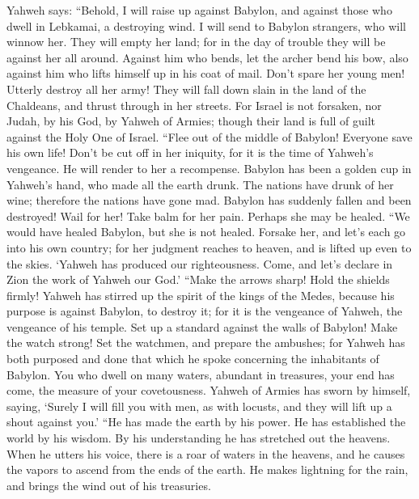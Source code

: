  Yahweh says: ``Behold, I will raise up against Babylon,
and against those who dwell in Lebkamai, a destroying wind.
 I will send to Babylon strangers, who will winnow her.
They will empty her land; for in the day of trouble they will be against
her all around.  Against him who bends, let the archer
bend his bow, also against him who lifts himself up in his coat of mail.
Don't spare her young men! Utterly destroy all her army! 
They will fall down slain in the land of the Chaldeans, and thrust
through in her streets.  For Israel is not forsaken, nor
Judah, by his God, by Yahweh of Armies; though their land is full of
guilt against the Holy One of Israel.  ``Flee out of the
middle of Babylon! Everyone save his own life! Don't be cut off in her
iniquity, for it is the time of Yahweh's vengeance. He will render to
her a recompense.  Babylon has been a golden cup in
Yahweh's hand, who made all the earth drunk. The nations have drunk of
her wine; therefore the nations have gone mad.  Babylon
has suddenly fallen and been destroyed! Wail for her! Take balm for her
pain. Perhaps she may be healed.  ``We would have healed
Babylon, but she is not healed. Forsake her, and let's each go into his
own country; for her judgment reaches to heaven, and is lifted up even
to the skies.  `Yahweh has produced our righteousness.
Come, and let's declare in Zion the work of Yahweh our God.'
 ``Make the arrows sharp! Hold the shields firmly! Yahweh
has stirred up the spirit of the kings of the Medes, because his purpose
is against Babylon, to destroy it; for it is the vengeance of Yahweh,
the vengeance of his temple.  Set up a standard against
the walls of Babylon! Make the watch strong! Set the watchmen, and
prepare the ambushes; for Yahweh has both purposed and done that which
he spoke concerning the inhabitants of Babylon.  You who
dwell on many waters, abundant in treasures, your end has come, the
measure of your covetousness.  Yahweh of Armies has sworn
by himself, saying, `Surely I will fill you with men, as with locusts,
and they will lift up a shout against you.'  ``He has
made the earth by his power. He has established the world by his wisdom.
By his understanding he has stretched out the heavens. 
When he utters his voice, there is a roar of waters in the heavens, and
he causes the vapors to ascend from the ends of the earth. He makes
lightning for the rain, and brings the wind out of his treasuries.
